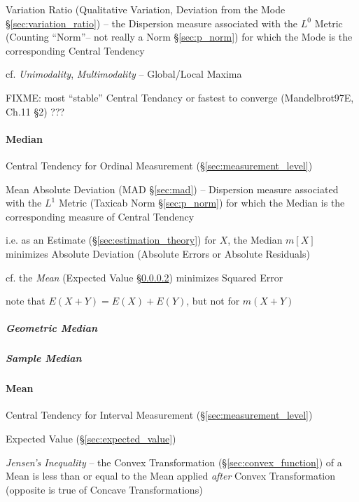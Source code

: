 \fist Variation Ratio (Qualitative Variation, Deviation from the Mode
\S\ref{sec:variation_ratio}) -- the Dispersion measure associated with the $L^0$
Metric (Counting ``Norm''-- not really a Norm \S\ref{sec:p_norm}) for which the
Mode is the corresponding Central Tendency

cf. \emph{Unimodality}, \emph{Multimodality} -- Global/Local Maxima

FIXME: most ``stable'' Central Tendancy or fastest to converge (Mandelbrot97E,
Ch.11 \S 2) ???



\paragraph{Median}\label{sec:median}\hfill

Central Tendency for Ordinal Measurement (\S\ref{sec:measurement_level})

\fist Mean Absolute Deviation (MAD \S\ref{sec:mad}) -- Dispersion measure
associated with the $L^1$ Metric (Taxicab Norm \S\ref{sec:p_norm}) for which the
Median is the corresponding measure of Central Tendency

i.e. as an Estimate (\S\ref{sec:estimation_theory}) for $X$, the Median $m[X]$
minimizes Absolute Deviation (Absolute Errors or Absolute Residuals)

cf. the \emph{Mean} (Expected Value \S\ref{sec:mean}) minimizes Squared Error

note that $E(X + Y) = E(X) + E(Y)$, but not for $m(X+Y)$



\subparagraph{Geometric Median}\label{sec:geometric_median}\hfill

\subparagraph{Sample Median}\label{sec:sample_median}\hfill



\paragraph{Mean}\label{sec:mean}\hfill

Central Tendency for Interval Measurement (\S\ref{sec:measurement_level})

\fist Expected Value (\S\ref{sec:expected_value})

\emph{Jensen's Inequality} -- the Convex Transformation
(\S\ref{sec:convex_function}) of a Mean is less than or equal to the Mean
applied \emph{after} Convex Transformation (opposite is true of Concave
Transformations)

